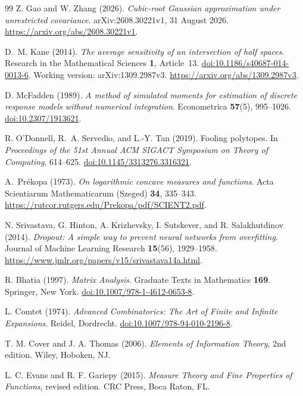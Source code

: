 \documentclass[11pt,letterpaper]{article}
\theoremstyle{remark}
\begin{document}
\begin{thebibliography}{99}
Z. Gao and W. Zhang (2026).
\emph{Cubic-root Gaussian approximation under unrestricted covariance}.
arXiv:2608.30221v1, 31 August 2026.
\url{https://arxiv.org/abs/2608.30221v1}.

D.~M. Kane (2014).
\emph{The average sensitivity of an intersection of half spaces}.
Research in the Mathematical Sciences \textbf{1}, Article~13.
\href{https://doi.org/10.1186/s40687-014-0013-6}{doi:10.1186/s40687-014-0013-6}.
Working version: arXiv:1309.2987v3.
\url{https://arxiv.org/abs/1309.2987v3}.

D. McFadden (1989).
\emph{A method of simulated moments for estimation of discrete
response models without numerical integration}.
Econometrica \textbf{57}(5), 995--1026.
\href{https://doi.org/10.2307/1913621}{doi:10.2307/1913621}.

R. O'Donnell, R.~A. Servedio, and L.-Y. Tan (2019).
Fooling polytopes.
In \emph{Proceedings of the 51st Annual ACM SIGACT Symposium on
Theory of Computing}, 614--625.
\href{https://doi.org/10.1145/3313276.3316321}{doi:10.1145/3313276.3316321}.

A.~Pr\'ekopa (1973).
\emph{On logarithmic concave measures and functions}.
Acta Scientiarum Mathematicarum (Szeged) \textbf{34}, 335--343.
\url{https://rutcor.rutgers.edu/Prekopa/pdf/SCIENT2.pdf}.

N. Srivastava, G. Hinton, A. Krizhevsky, I. Sutskever, and
R. Salakhutdinov (2014).
\emph{Dropout: A simple way to prevent neural networks from overfitting}.
Journal of Machine Learning Research \textbf{15}(56), 1929--1958.
\url{https://www.jmlr.org/papers/v15/srivastava14a.html}.

R. Bhatia (1997).
\emph{Matrix Analysis}.
Graduate Texts in Mathematics \textbf{169}. Springer, New York.
\href{https://doi.org/10.1007/978-1-4612-0653-8}{doi:10.1007/978-1-4612-0653-8}.

L. Comtet (1974).
\emph{Advanced Combinatorics: The Art of Finite and Infinite Expansions}.
Reidel, Dordrecht.
\href{https://doi.org/10.1007/978-94-010-2196-8}{doi:10.1007/978-94-010-2196-8}.

T. M. Cover and J. A. Thomas (2006).
\emph{Elements of Information Theory}, 2nd edition.
Wiley, Hoboken, NJ.

L. C. Evans and R. F. Gariepy (2015).
\emph{Measure Theory and Fine Properties of Functions}, revised edition.
CRC Press, Boca Raton, FL.


\end{thebibliography}
\end{document}
